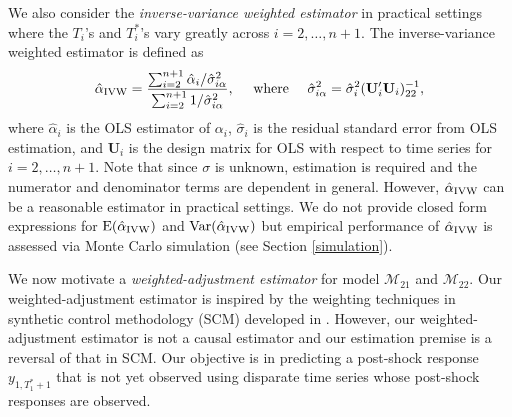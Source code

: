 \documentclass[11pt]{article}
\def\mbf#1{\mathbf{#1}} %
\def\mc#1{\mathcal{#1}} %
\def\E#1{\mathrm{E}(#1)} %
\def\var#1{\mathrm{Var}(#1)} %
\theoremstyle{definition}
\begin{document}
We also consider the \emph{inverse-variance weighted estimator} 
in practical settings where the $T_i$'s and $T_i^*$'s vary greatly across $i=2, \ldots, n+1$. 
The inverse-variance weighted estimator is defined as 
\begin{align*}
  \hat{\alpha}_{\rm IVW} = \frac{\sum_{i=2}^{n+1} \hat{\alpha}_i / \hat{\sigma}_{i\alpha}^2}{\sum_{i=2}^{n+1} 1/\hat{\sigma}_{i\alpha}^2},
  \quad \text{ where } \quad  \hat{\sigma}_{i\alpha}^2 = \hat{\sigma}^2_i( \mathbf{U}_i'\mbf{U}_i)_{22}^{-1},
\end{align*}
where  $\hat{\alpha}_i$ is the OLS estimator of $\alpha_i$, 
$\hat{\sigma}_i$ is the residual standard error from OLS estimation, 
and $\mbf{U}_i$ is the design matrix for OLS with respect to time series 
for $i = 2, \ldots, n+1$. Note that since $\sigma$ is unknown, estimation 
is required and the numerator and denominator terms are dependent in general. 
However, $\hat{\alpha}_{\rm IVW}$ can be a reasonable estimator in 
practical settings. %
We do not provide closed form expressions for $\E{\hat{\alpha}_{\rm IVW}}$ 
and $\var{\hat{\alpha}_{\rm IVW}}$ but empirical performance of 
$\hat{\alpha}_{\rm IVW}$ is assessed via Monte Carlo simulation 
(see Section \ref{simulation}).

We now motivate a \emph{weighted-adjustment estimator} for model $\mc{M}_{21}$ 
and $\mc{M}_{22}$. Our weighted-adjustment estimator is inspired by the 
weighting techniques in synthetic control methodology (SCM) developed 
in \cite{abadie2010synthetic}. 
However, our weighted-adjustment estimator is not a causal estimator and 
our estimation premise is a reversal of that in SCM. 
Our objective is in predicting a post-shock response $y_{1,T_1^*+1}$ that is not yet 
observed using disparate time series whose post-shock responses are observed.
\end{document}
